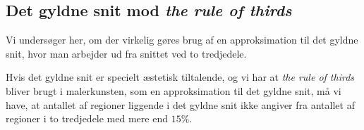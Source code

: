 {\subsection{Det gyldne snit mod \emph{the rule of thirds}}
Vi undersøger her, om der virkelig gøres brug af en approksimation til
det gyldne snit, hvor man arbejder ud fra snittet ved to tredjedele.

\begin{hypotese}
    Hvis det gyldne snit er specielt æstetisk tiltalende, og vi har at
    \emph{the rule of thirds} bliver brugt i malerkunsten, som en
    approksimation til det gyldne snit, må vi have, at antallet af
    regioner liggende i det gyldne snit ikke angiver fra antallet af
    regioner i to tredjedele med mere end $15\%$.
\end{hypotese}

}
